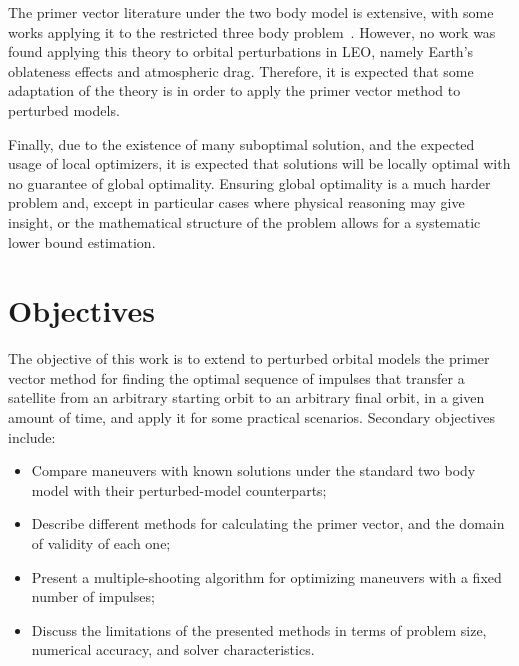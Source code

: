 The primer vector literature under the two body model is extensive, with some works applying it to the restricted three body problem~\cite{impulsive_europa}. However, no work was found applying this theory to orbital perturbations in LEO, namely Earth's oblateness effects and atmospheric drag. Therefore, it is expected that some adaptation of the theory is in order to apply the primer vector method to perturbed models. 

Finally, due to the existence of many suboptimal solution, and the expected usage of local optimizers, it is expected that solutions will be locally optimal with no guarantee of global optimality. Ensuring global optimality is a much harder problem and, except in particular cases where physical reasoning may give insight, or the mathematical structure of the problem allows for a systematic lower bound estimation.



\section{Objectives}

The objective of this work is to extend to perturbed orbital models the primer vector method for finding the optimal sequence of impulses that transfer a satellite from an arbitrary starting orbit to an arbitrary final orbit, in a given amount of time, and apply it for some practical scenarios. Secondary objectives include:
\begin{itemize}
    \item Compare maneuvers with known solutions under the standard two body model with their perturbed-model counterparts;
    \item Describe different methods for calculating the primer vector, and the domain of validity of each one;
    \item Present a multiple-shooting algorithm for optimizing maneuvers with a fixed number of impulses;
    \item Discuss the limitations of the presented methods in terms of problem size, numerical accuracy, and solver characteristics.
\end{itemize}

